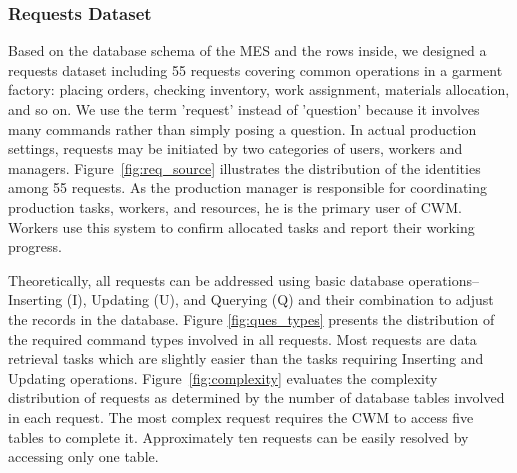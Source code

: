 \documentclass[preprint,12pt]{elsarticle}
\begin{document}
\subsubsection{Requests Dataset}
Based on the database schema of the MES and the rows inside, we designed a requests dataset including 55 requests covering common operations in a garment factory: placing orders, checking inventory, work assignment, materials allocation, and so on.
We use the term 'request' instead of 'question' because it involves many commands rather than simply posing a question.
In actual production settings, requests may be initiated by two categories of users, workers and managers. Figure~\ref{fig:req_source} illustrates the distribution of the identities among 55 requests.
As the production manager is responsible for coordinating production tasks, workers, and resources, he is the primary user of CWM.
Workers use this system to confirm allocated tasks and report their working progress.

Theoretically, all requests can be addressed using basic database operations--Inserting (I), Updating (U), and Querying (Q) and their combination to adjust the records in the database.
Figure \ref{fig:ques_types} presents the distribution of the required command types involved in all requests.
Most requests are data retrieval tasks which are slightly easier than the tasks requiring Inserting and Updating operations.
Figure~\ref{fig:complexity} evaluates the complexity distribution of requests as determined by the number of database tables involved in each request.
The most complex request requires the CWM to access five tables to complete it.
Approximately ten requests can be easily resolved by accessing only one table.
\end{document}
